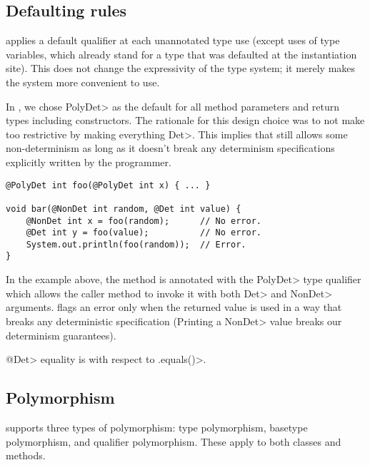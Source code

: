 \subsection{Defaulting rules}\label{defaulting}

\TheDeterminismChecker applies a default qualifier at each unannotated type
use (except uses of type variables, which already stand for a type that was
defaulted at the instantiation site).
This does not change the expressivity of the type system; it merely makes
the system more convenient to use.

In \theDeterminismChecker, we chose \<PolyDet> as the default for all 
method parameters and return types including constructors.
The rationale for this design choice was to not make \theDeterminismChecker too restrictive by making everything \<Det>.  This implies that
\theDeterminismChecker still allows some non-determinism as long as it doesn't break any determinism specifications explicitly written by the programmer.

\begin{verbatim}
@PolyDet int foo(@PolyDet int x) { ... }

void bar(@NonDet int random, @Det int value) {
    @NonDet int x = foo(random);      // No error.
    @Det int y = foo(value);          // No error.
    System.out.println(foo(random));  // Error.
}
\end{verbatim}
In the example above, the method  is annotated with the \<PolyDet> type qualifier which allows
the caller method  to invoke it with both \<Det> and \<NonDet> arguments. \TheDeterminismChecker flags an error 
only when the returned value is used in a way that breaks any deterministic specification (Printing a \<NonDet> value
breaks our determinism guarantees).


\<@Det> equality is with respect to \<.equals()>.


\subsection{Polymorphism}\label{java-polymorphism}

\OurTypeSystem supports three types of polymorphism:  type
polymorphism, basetype polymorphism, and qualifier polymorphism.
These apply to both classes and methods.

